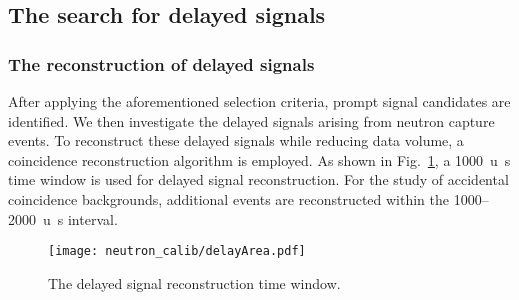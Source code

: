 \subsection{The search for delayed signals}
\subsubsection{The reconstruction of delayed signals}
\label{sec:coincidentRecon}
After applying the aforementioned selection criteria, prompt signal candidates are identified.
We then investigate the delayed signals arising from neutron capture events.
To reconstruct these delayed signals while reducing data volume, a coincidence reconstruction algorithm is employed.
As shown in Fig.~\ref{fig:delayedCoincidence}, a \SI{1000}{u\second} time window is used for delayed signal reconstruction.
For the study of accidental coincidence backgrounds, additional events are reconstructed within the 1000--\SI{2000}{u\second} interval.
\begin{figure}[htbp]
	\centering
	{\texttt{[image: neutron\_calib/delayArea.pdf]}}
	\caption{The delayed signal reconstruction time window.}
	\label{fig:delayedCoincidence}
\end{figure}
